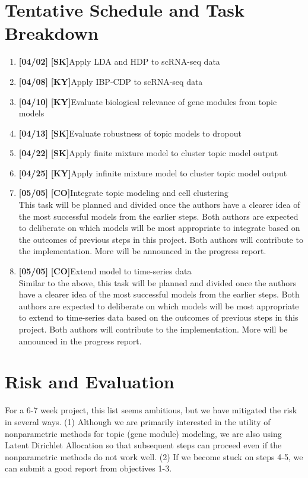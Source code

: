 \documentclass[11pt]{article}
\newcommand\tab[1][1cm]{\hspace*{#1}}
\newcommand{\SK}{\textbf{[SK]}\tab}
\newcommand{\KY}{\textbf{[KY]}\tab}
\newcommand{\CO}{\textbf{[CO]}\tab}
\newcommand\cdate[1][1cm]{\textbf{[#1]}}
\begin{document}
\section{Tentative Schedule and Task Breakdown}
\begin{enumerate}
    \item \cdate[04/02] \SK Apply LDA and HDP to scRNA-seq data
    \item \cdate[04/08] \KY Apply IBP-CDP to scRNA-seq data
    \item \cdate[04/10] \KY Evaluate biological relevance of gene modules from topic models
    \item \cdate[04/13] \SK Evaluate robustness of topic models to dropout
    \item \cdate[04/22] \SK Apply finite mixture model to cluster topic model output
    \item \cdate[04/25] \KY Apply infinite mixture model to cluster topic model output
    \item \cdate[05/05] \CO Integrate topic modeling and cell clustering \\
    This task will be planned and divided once the authors have a clearer idea of the most successful models from the earlier steps. Both authors are expected to deliberate on which models will be most appropriate to integrate based on the outcomes of previous steps in this project. Both authors will contribute to the implementation. More will be announced in the progress report.
    \item \cdate[05/05] \CO Extend model to time-series data \\
    Similar to the above, this task will be planned and divided once the authors have a clearer idea of the most successful models from the earlier steps. Both authors are expected to deliberate on which models will be most appropriate to extend to time-series data based on the outcomes of previous steps in this project. Both authors will contribute to the implementation. More will be announced in the progress report.

\end{enumerate}

\section{Risk and Evaluation}
For a 6-7 week project, this list seems ambitious, but we have mitigated the risk in several ways. (1) Although we are primarily interested in the utility of nonparametric methods for topic (gene module) modeling, we are also using Latent Dirichlet Allocation so that subsequent steps can proceed even if the nonparametric methods do not work well. (2) If we become stuck on steps 4-5, we can submit a good report from objectives 1-3. \\
\end{document}
